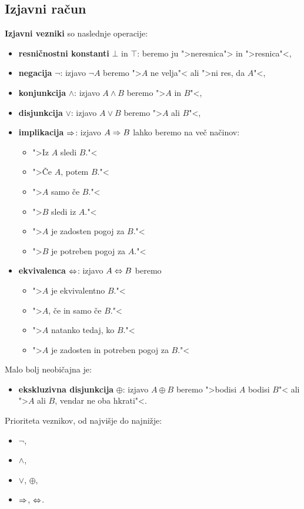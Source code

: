 \subsection{Izjavni račun}

\textbf{Izjavni vezniki} so naslednje operacije:
%
\begin{itemize}

\item \textbf{resničnostni konstanti} $\bot$ in $\top$: beremo ju ">neresnica"> in ">resnica"<,

\item \textbf{negacija} $\neg$: izjavo $\neg A$ beremo ">$A$ ne velja"< ali ">ni res, da $A$"<,

\item \textbf{konjunkcija} $\land$: izjavo $A \land B$ beremo ">$A$ in $B$"<,

\item \textbf{disjunkcija} $\lor$: izjavo $A \lor B$ beremo ">$A$ ali $B$"<,

\item \textbf{implikacija} $\Rightarrow$: izjavo $A \Rightarrow B$ lahko beremo na več načinov:
  \begin{itemize}
  \item ">Iz $A$ sledi $B$."<
  \item ">Če $A$, potem $B$."<
  \item ">$A$ samo če $B$."<
  \item ">$B$ sledi iz $A$."<
  \item ">$A$ je zadosten pogoj za $B$."<
  \item ">$B$ je potreben pogoj za $A$."<
  \end{itemize}
\item \textbf{ekvivalenca} $\Leftrightarrow$: izjavo $A \Leftrightarrow B$ beremo
  \begin{itemize}
  \item ">$A$ je ekvivalentno $B$."<
  \item ">$A$, če in samo če $B$."<
  \item ">$A$ natanko tedaj, ko $B$."<
  \item ">$A$ je zadosten in potreben pogoj za $B$."<
  \end{itemize}
\end{itemize}
%
Malo bolj neobičajna je:
%
\begin{itemize}
\item \textbf{ekskluzivna disjunkcija} $\oplus$: izjavo $A \oplus B$ beremo ">bodisi $A$ bodisi $B$"< ali ">$A$ ali $B$, vendar ne oba hkrati"<.
\end{itemize}
%
Prioriteta veznikov, od najvišje do najnižje:
%
\begin{itemize}
\item $\neg$,
\item $\land$,
\item $\lor$, $\oplus$,
\item $\Rightarrow$, $\Leftrightarrow$.
\end{itemize}

